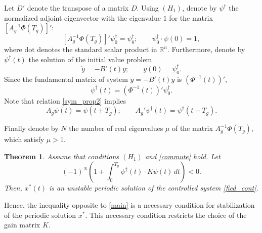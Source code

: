 \documentclass{article}
\newtheorem{theorem}{Theorem}[section]
\begin{document}
Let $D'$ denote the transpose of a matrix $D$.
Using $(H_1)$, denote by $\psi^\dagger$ the normalized adjoint eigenvector with the eigenvalue $1$ for the matrix $[A_g^{-1}\Phi(T_g)]'$:
\[
[A_g^{-1}\Phi(T_g)]' \psi_0^\dagger=\psi_0^\dagger;\qquad  \psi_0^\dagger \cdot \psi(0) =1,
\]
where dot denotes the standard scalar product in $\mathbb{R}^n$.
Furthermore, denote by $\psi^\dagger(t)$ the solution of the initial value problem
\[
\dot y= -B'(t) y; \qquad y(0)=\psi_0^\dagger.
\]
Since the fundamental matrix of system $\dot y= -B'(t) y$ is $(\Phi^{-1}(t))'$,
\begin{equation}\label{phi'}
\psi^\dagger(t)=(\Phi^{-1}(t))'\psi^\dagger_0.
\end{equation}
Note that relation \eqref{sym_prop2} implies
\[
A_g \psi(t)= \psi(t+T_g);\qquad A_g'\psi^\dagger(t)= \psi^\dagger(t-T_g).
\]

Finally denote by $N$ the number of real eigenvalues $\mu$ of the matrix $A_g^{-1}\Phi(T_g)$, which satisfy $\mu>1$.

\begin{theorem}\label{t1}
Assume that conditions $(H_1)$ and \eqref{commute} hold. Let
\begin{equation}\label{main}
(-1)^N\left(1 + \int_{0}^{T_g}  \psi^\dagger (t)\cdot K \psi(t)\,dt\right)<0.
\end{equation}
Then, $x^*(t)$ is an {\em unstable} periodic solution of the controlled system \eqref{fied_cont}.
\end{theorem}
Hence, the inequality opposite to \eqref{main} is a necessary condition for stabilization of the periodic solution $x^*$.
This necessary condition restricts the choice of the gain matrix $K$.
\end{document}
